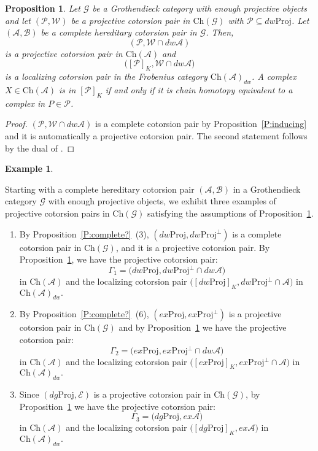 \documentclass[11pt,a4paper,reqno]{amsart}
\newcommand{\A}{\mathcal{A}}
\newcommand{\B}{\mathcal{B}}
\newcommand{\E}{\mathcal{E}}
\newcommand{\G}{\mathcal{G}}
\newcommand{\clP}{\mathcal{P}}
\newcommand{\W}{\mathcal{W}}
\newcommand{\Ch}{\mathrm{Ch}}
\newcommand{\Proj}{\mathrm{Proj}}
\theoremstyle{plain}
\newtheorem{prop}[thm]{Proposition}
\theoremstyle{definition}
\newtheorem{expl}[thm]{Example}
\theoremstyle{remark}
\begin{document}
 \begin{prop}\label{P:7.2-Groth} Let $\G$ be a Grothendieck category with enough projective objects and let $(\clP, \W)$ be a projective cotorsion pair in $\Ch(\G)$ with $\clP\subseteq dw\Proj$.
 Let $(\A, \B)$ be a complete hereditary cotorsion pair in $\G$. Then,
 \[(\clP, \W\cap dw\A)\] is a projective cotorsion pair in $\Ch(\A)$ and \[\Big([\clP]_K, \W\cap dw \A\Big)\] is a localizing cotorsion pair in the Frobenius category $\Ch(\A)_{dw}$. A complex $X\in \Ch(\A)$ is in $[\clP]_K$ if and only if it is chain homotopy equivalent to a complex in $P\in \clP$.
 \end{prop}
 \begin{proof} $(\clP, \W\cap dw\A)$ is a complete cotorsion pair by Proposition~\ref{P:inducing} and it is automatically a projective cotorsion pair. The second statement follows by the dual of \cite[Theorem 6.3, Proposition 6.4]{G7}.
\end{proof}
\begin{expl}\label{E:exam-A-proj}

Starting with a complete hereditary cotorsion pair $(\A, \B)$ in a Grothendieck  category $\G$ with enough projective objects, we exhibit three examples of projective cotorsion pairs in $\Ch(\G)$ satisfying the assumptions of Proposition~\ref{P:7.2-Groth}.

%
 \begin{enumerate}
\item  By Proposition~\ref{P:complete?}~(3), $(dw\Proj, dw \Proj{}^\perp{})$ is a complete cotorsion pair  in $\Ch(\G)$, and it is a projective cotorsion pair. By Proposition~\ref{P:7.2-Groth},  we have the projective cotorsion pair:
 \[\Gamma_1=\Big(dw\Proj, dw \Proj{}^\perp{}\cap dw\A\Big)\] in $\Ch(\A)$ and the localizing cotorsion pair $\Big([dw\Proj]_K, dw \Proj{}^\perp{}\cap\A\Big)$ in $\Ch(\A)_{dw}.$
 \item By Proposition~\ref{P:complete?}~(6), $(ex\Proj, ex\Proj{}^\perp{})$ is a projective cotorsion pair in $\Ch(\G)$ and by Proposition~\ref{P:7.2-Groth} we have the projective cotorsion pair:
  \[\Gamma_2=\Big(ex\Proj, ex \Proj{}^\perp{}\cap dw\A\Big)\] in $\Ch(\A)$ and the localizing cotorsion pair $\Big([ex\Proj]_K, ex \Proj{}^\perp{}\cap\A\Big)$ in $\Ch(\A)_{dw}.$
  \item Since $(dg\Proj, \E )$ is a projective cotorsion pair in $\Ch(\G)$, by Proposition~\ref{P:7.2-Groth} we have the projective cotorsion pair:
  \[\Gamma_3=\Big(dg\Proj, ex\A\Big)\]  in $\Ch(\A)$ and the localizing cotorsion pair $\Big([dg\Proj]_K, ex\A\Big)$ in $\Ch(\A)_{dw}.$
\end{enumerate}
\end{expl}
\end{document}
